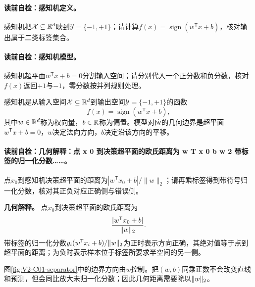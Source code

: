 \paragraph{读前自检：感知机定义。}感知机把$\mathcal X\subseteq\mathbb{R}^d$映到$\mathcal Y=\{-1,+1\}$；请计算$f(x)=\operatorname{sign}(w^{\mathsf T}x+b)$，核对输出属于二类标签集合。\par

\label{struct:V2-C01-CH08}
\paragraph{读前自检：感知机模型。}感知机超平面$w^{\mathsf T}x+b=0$分割输入空间；请分别代入一个正分数和负分数，核对$f(x)$返回$+1$与$-1$，零分数按并列规则处理。\par

\begin{definition}[感知机模型]\label{def:V2-C01-model}
感知机是从输入空间$\mathcal X\subseteq\mathbb{R}^d$到输出空间$\mathcal Y=\{-1,+1\}$的函数
\[
f(x)=\operatorname{sign}(w^{\mathsf T}x+b),
\]
其中$w\in\mathbb{R}^d$称为权向量，$b\in\mathbb{R}$称为偏置。模型对应的几何边界是超平面$w^{\mathsf T}x+b=0$，$w$决定法向方向，$b$决定沿该方向的平移。
\end{definition}

\label{struct:V2-C01-CH14}
\paragraph{读前自检：几何解释：点 x 0 到决策超平面的欧氏距离为 w T x 0 b w 2 带标签的归一化分数……。}点$x_0$到感知机决策超平面的距离为$|w^{\mathsf T}x_0+b|/\lVert w\rVert_2$；请再乘标签得到带符号归一化分数，核对其正负对应正确侧与错误侧。\par

\begin{geometrybox}
\textbf{几何解释。}
点$x_0$到决策超平面的欧氏距离为
\[
\frac{\lvert w^{\mathsf T}x_0+b\rvert}{\lVert w\rVert_2}.
\]
带标签的归一化分数$y_i(w^{\mathsf T}x_i+b)/\lVert w\rVert_2$为正时表示方向正确，其绝对值等于点到超平面的距离；为负时表示样本位于标签所要求半空间的另一侧。
\end{geometrybox}

\label{struct:V2-C01-CH17}

图\ref{fig:V2-C01-separator}中的边界方向由$w$控制。把$(w,b)$同乘正数不会改变直线和预测，但会同比放大未归一化分数；因此几何距离需要除以$\lVert w\rVert_2$。


